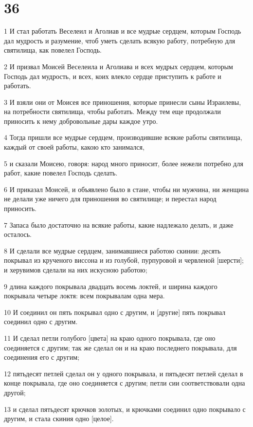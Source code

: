 \chapter{36}

\par 1 И стал работать Веселеил и Аголиав и все мудрые сердцем, которым Господь дал мудрость и разумение, чтоб уметь сделать всякую работу, потребную для святилища, как повелел Господь.
\par 2 И призвал Моисей Веселеила и Аголиава и всех мудрых сердцем, которым Господь дал мудрость, и всех, коих влекло сердце приступить к работе и работать.
\par 3 И взяли они от Моисея все приношения, которые принесли сыны Израилевы, на потребности святилища, чтобы работать. Между тем еще продолжали приносить к нему добровольные дары каждое утро.
\par 4 Тогда пришли все мудрые сердцем, производившие всякие работы святилища, каждый от своей работы, какою кто занимался,
\par 5 и сказали Моисею, говоря: народ много приносит, более нежели потребно для работ, какие повелел Господь сделать.
\par 6 И приказал Моисей, и объявлено было в стане, чтобы ни мужчина, ни женщина не делали уже ничего для приношения во святилище; и перестал народ приносить.
\par 7 Запаса было достаточно на всякие работы, какие надлежало делать, и даже осталось.
\par 8 И сделали все мудрые сердцем, занимавшиеся работою скинии: десять покрывал из крученого виссона и из голубой, пурпуровой и червленой [шерсти]; и херувимов сделали на них искусною работою;
\par 9 длина каждого покрывала двадцать восемь локтей, и ширина каждого покрывала четыре локтя: всем покрывалам одна мера.
\par 10 И соединил он пять покрывал одно с другим, и [другие] пять покрывал соединил одно с другим.
\par 11 И сделал петли голубого [цвета] на краю одного покрывала, где оно соединяется с другим; так же сделал он и на краю последнего покрывала, для соединения его с другим;
\par 12 пятьдесят петлей сделал он у одного покрывала, и пятьдесят петлей сделал в конце покрывала, где оно соединяется с другим; петли сии соответствовали одна другой;
\par 13 и сделал пятьдесят крючков золотых, и крючками соединил одно покрывало с другим, и стала скиния одно [целое].
